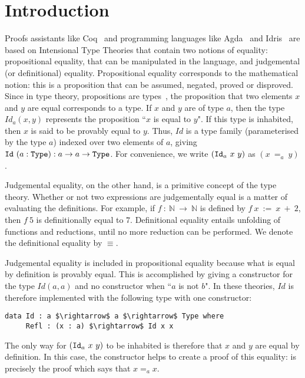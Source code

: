 \section{Introduction}

Proofs assistants like Coq~\cite{BertotC04} 
and programming languages like 
Agda~\cite{norell2007thesis} and
Idris~\cite{brady2013idris} are based on Intensional Type Theories that contain
two notions of equality: propositional equality, that can be
manipulated in the language, and judgemental (or definitional) equality.
Propositional equality corresponds to the mathematical notion: this is
a proposition that can be assumed, negated, proved or disproved. Since in type
theory, propositions are types~\cite{How80}, the proposition that two
elements $x$ and $y$ are equal corresponds to a type.
If $x$ and $y$ are of type $a$, then the type
$Id_a(x, y)$ represents the proposition ``$x$ is equal to $y$". If this type is
inhabited, then $x$ is said to be provably equal to $y$. Thus, $Id$ is a type family (parameterised by the type $a$) indexed over two elements of $a$, giving ${\mbox{\texttt{Id}}}\ (a:{\mbox{\texttt{Type}}}):a \rightarrow a \rightarrow {\mbox{\texttt{Type}}}$. For
convenience, we write $(\code{Id}_a\ x\ y)$ as $(x\ =_a\ y)$. 

Judgemental equality, on the other hand, is a primitive concept of
the type theory.
Whether or not two expressions are judgementally equal is a matter of
evaluating the definitions. For example, if $f\ :\ \mathbb{N}\ \rightarrow\
\mathbb{N}$ is defined by $f\ x\ :=\ x\ +\ 2$, then $f\ 5$ is
definitionally equal to $7$. Definitional equality entails unfolding
of functions and reductions, until no more reduction can be
performed. We denote the definitional equality by $\equiv$.

Judgemental equality is included in propositional equality
because what is equal by definition is provably equal. This is
accomplished by giving a constructor for the type $Id(a,a)$ and no
constructor when ``$a$ is not $b$".  In these theories, $Id$ is therefore
implemented with the following type with one constructor:

\begin{lstlisting}
data Id : a $\rightarrow$ a $\rightarrow$ Type where
     Refl : (x : a) $\rightarrow$ Id x x
\end{lstlisting}

The only way for $(\code{Id}_a\ x\ y)$ to be inhabited is therefore that $x$ and $y$ are equal by definition. In this case, the constructor  helps to create a proof of this equality:  is precisely the proof
which says that $x=_ax$. 

